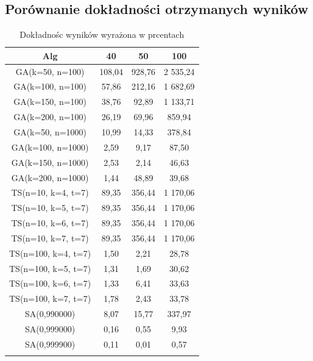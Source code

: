 \documentclass[wide,a4paper,titlepage,12pt] {article}
\begin{document}
\subsection{Porównanie dokładności otrzymanych wyników}
\begin{center}
    \begin{longtable}{|c|c|c|c|}
        \hline
         Alg  & 40&  50 & 100 \\ \hline
        GA(k=50, n=100)& 108,04&  928,76 & 2 535,24\\ \hline
        GA(k=100, n=100)  &  57,86 &  212,16 & 1 682,69\\ \hline
        GA(k=150, n=100)  &  38,76  & 92,89&   1 133,71\\ \hline
        GA(k=200, n=100)   & 26,19  & 69,96 &  859,94\\ \hline
        GA(k=50, n=1000)   & 10,99 &  14,33 &  378,84\\ \hline
        GA(k=100, n=1000) & 2,59  &  9,17  &  87,50\\ \hline
        GA(k=150, n=1000) &  2,53  &  2,14 &   46,63\\ \hline
        GA(k=200, n=1000)  & 1,44   & 48,89&   39,68\\ \hline
        TS(n=10, k=4, t=7) & 89,35  & 356,44 & 1 170,06\\ \hline
        TS(n=10, k=5, t=7) & 89,35  & 356,44&  1 170,06\\ \hline
        TS(n=10, k=6, t=7) & 89,35 &  356,44&  1 170,06\\ \hline
        TS(n=10, k=7, t=7) & 89,35 &  356,44 & 1 170,06\\ \hline
        TS(n=100, k=4, t=7) &1,50 &   2,21 &   28,78\\ \hline
        TS(n=100, k=5, t=7) &1,31  &  1,69 &   30,62\\ \hline
        TS(n=100, k=6, t=7)& 1,33 &  6,41  &  33,63\\ \hline
        TS(n=100, k=7, t=7) &1,78  & 2,43  &  33,78\\ \hline
        SA(0,990000)  &  8,07   & 15,77 &  337,97\\ \hline
        SA(0,999000)  &  0,16  &  0,55  &  9,93\\ \hline
        SA(0,999900)  &  0,11  &  0,01 &   0,57\\ \hline
        \caption{Dokładnośc wyników wyrażona w prcentach}
    \end{longtable}

\end{center}
\end{document}
